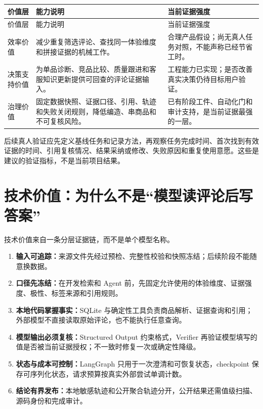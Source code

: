 \begin{longtable}{>{\raggedright\arraybackslash}p{}>{\raggedright\arraybackslash}p{}>{\raggedright\arraybackslash}p{}}
\toprule
价值层 & 能力说明 & 当前证据强度 \\
\midrule
\endfirsthead
\toprule
价值层 & 能力说明 & 当前证据强度 \\
\midrule
\endhead
效率价值 & 减少重复筛选评论、查找同一体验维度和拼接证据的机械工作。 & 合理产品假设；尚无真人任务对照，不能声称已经节省工时。 \\
决策支持价值 & 为单品诊断、竞品比较、质量跟进和客服知识更新提供可回查的评论证据输入。 & 工程能力已实现；是否改善真实决策仍待目标用户验证。 \\
治理价值 & 固定数据快照、证据口径、引用、轨迹和失败关闭规则，降低编造、串商品和不可复核风险。 & 已有阶段工件、自动化门和审计支持，是当前证据最强的一层。 \\
\bottomrule
\end{longtable}

\begin{advicebox}
后续真人验证应先定义基线任务和记录方法，再观察任务完成时间、首次找到有效证据的时间、引用复核情况、结果采纳或修改、失败原因和重复使用意愿。这些是建议的验证指标，不是当前项目结果。
\end{advicebox}

\section{技术价值：为什么不是“模型读评论后写答案”}

技术价值来自一条分层证据链，而不是单个模型名称。

\begin{enumerate}
  \item \textbf{输入可追踪：}来源文件先经过预检、完整性校验和快照冻结；后续阶段不能随意换数据。
  \item \textbf{口径先冻结：}在开发检索和 Agent 前，先固定允许使用的体验维度、证据强度、极性、标签来源和引用规则。
  \item \textbf{本地代码掌握事实：}SQLite 与确定性工具负责商品解析、证据查询和引用；外部模型不直接读取原始评论，也不能执行任意查询。
  \item \textbf{模型输出必须复核：}Structured Output 约束格式，Verifier 再验证模型填写的值是否被当前证据授权；不一致时修复一次或确定性降级。
  \item \textbf{状态与成本可控制：}LangGraph 只用于一次澄清和可恢复状态，checkpoint 保存可序列化状态，请求预算按真实外部尝试单调计数。
  \item \textbf{结论有界发布：}本地敏感轨迹和公开聚合轨迹分开，公开结果还需值级扫描、源码身份和完成审计。
\end{enumerate}


